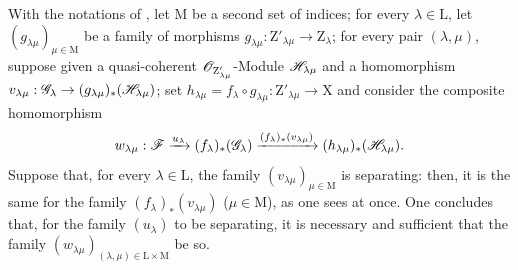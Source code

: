 \begin{env}[11.9.2]
\label{IV.11.9.2}
With the notations of , let $\mathrm{M}$ be a second set of indices; for every $\lambda\in\mathrm{L}$, let $(g_{\lambda\mu})_{\mu\in\mathrm{M}}$ be a family of morphisms $g_{\lambda\mu}:\mathrm{Z}'_{\lambda\mu}\to\mathrm{Z}_\lambda$; for every pair $(\lambda,\mu)$, suppose given a quasi-coherent $\mathscr{O}_{\mathrm{Z}'_{\lambda\mu}}$-Module $\mathscr{H}_{\lambda\mu}$ and a homomorphism $v_{\lambda\mu}:\mathscr{G}_\lambda\to(g_{\lambda\mu})_*(\mathscr{H}_{\lambda\mu})$; set $h_{\lambda\mu}=f_\lambda\circ g_{\lambda\mu}:\mathrm{Z}'_{\lambda\mu}\to\mathrm{X}$ and consider the composite homomorphism
\[
  w_{\lambda\mu}:\mathscr{F}\xrightarrow{u_\lambda}(f_\lambda)_*(\mathscr{G}_\lambda)\xrightarrow{(f_\lambda)_*(v_{\lambda\mu})}(h_{\lambda\mu})_*(\mathscr{H}_{\lambda\mu}).
\]
Suppose that, for every $\lambda\in\mathrm{L}$, the family $(v_{\lambda\mu})_{\mu\in\mathrm{M}}$ is separating: then, it is the same for the family $(f_\lambda)_*(v_{\lambda\mu})$ ($\mu\in\mathrm{M}$), as one sees at once.
One concludes that, for the family $(u_\lambda)$ to be separating, it is necessary and sufficient that the family $(w_{\lambda\mu})_{(\lambda,\mu)\in\mathrm{L}\times\mathrm{M}}$ be so.
\end{env}

